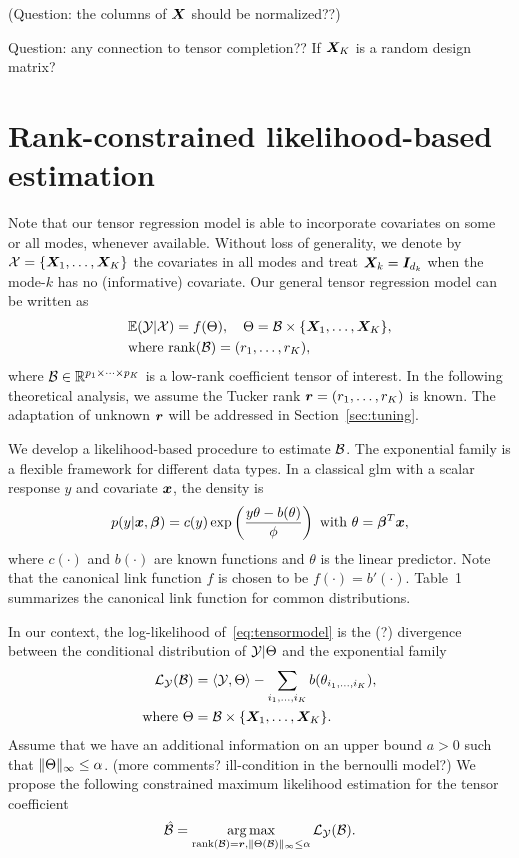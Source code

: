 \documentclass[11pt]{article}
\theoremstyle{plain}
\theoremstyle{definition}
\begin{document}
(Question: the columns of $\bm X$ should be normalized??)

Question: any connection to tensor completion?? If $\bm X_K$ is a random design matrix? 

\section{Rank-constrained likelihood-based estimation}
Note that our tensor regression model is able to incorporate covariates on some or all modes, whenever available. Without loss of generality, we denote by $\mathcal{X}=\{\bm X_1,\ldots,\bm X_K\}$ the covariates in all modes and treat $\bm X_k=\bm I_{d_k}$ when the mode-$k$ has no (informative) covariate. Our general tensor regression model can be written as
\begin{align}\label{eq:tensormodel}
&\mathbb{E}(\mathcal{Y}|\mathcal{X})=f(\Theta),\quad \Theta =\mathcal{B}\times\{\bm X_1,\ldots,\bm X_K\},\notag\\
&\text{where}\ \text{rank}(\mathcal{B})=(r_1,\ldots,r_K),
\end{align}
where $\mathcal{B}\in\mathbb{R}^{p_1\times \cdots\times p_K}$ is a low-rank coefficient tensor of interest. In the following theoretical analysis, we assume the Tucker rank $\bm{r}=(r_1,\ldots,r_K)$ is known. The adaptation of unknown $\bm{r}$ will be addressed in Section~\ref{sec:tuning}. 

We develop a likelihood-based procedure to estimate $\mathcal{B}$. The exponential family is a flexible framework for different data types. In a classical glm with a scalar response $y$ and covariate $\bm x$, the density is 
\[
p(y|\bm x, \boldsymbol{\beta})=c(y)\exp\left({y\theta- b(\theta) \over \phi}\right)\ \text{with}\ \theta=\boldsymbol{\beta}^T\bm x,
\]
where $c(\cdot)$ and $b(\cdot)$ are known functions and $\theta$ is the linear predictor. Note that the canonical link function $f$ is chosen to be $f(\cdot)=b'(\cdot)$. Table~1 summarizes the canonical link function for common distributions. 

In our context, the log-likelihood of~\eqref{eq:tensormodel} is the (?) divergence between the conditional distribution of $\mathcal{Y}|\Theta$ and the exponential family
\begin{align}
\mathcal{L}_{\mathcal{Y}}(\mathcal{B})&=\langle \mathcal{Y}, \Theta \rangle - \sum_{i_1,\ldots,i_K} b(\theta_{i_1,\ldots,i_K}),\\
\text{where}\ \Theta&=\mathcal{B}\times\{\bm X_1,\ldots,\bm X_K\}.
\end{align}
Assume that we have an additional information on an upper bound $a>0$ such that $\lVert\Theta\rVert_\infty\leq \alpha$. (more comments? ill-condition in the bernoulli model?)
We propose the following constrained maximum likelihood estimation for the tensor coefficient
\begin{equation}\label{eq:MLE}
\hat {\mathcal{B}}=\operatorname*{arg\,max}_{\text{rank}(\mathcal{B})= \bm{r}, \lVert\Theta(\mathcal{B})\rVert_\infty\leq \alpha} \mathcal{L}_{\mathcal{Y}}(\mathcal{B}).
\end{equation}
\end{document}
